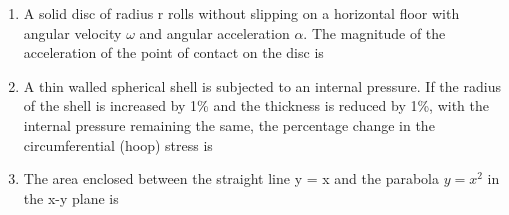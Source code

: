 \documentclass[journal,11pt,onecolumn]{IEEEtran}
\begin{document}
\begin{enumerate}
    \item A solid disc of radius r rolls without slipping on a horizontal floor with angular velocity \(\omega\) and angular acceleration \(\alpha\). The magnitude of the acceleration of the point of contact on the disc is

          \begin{enumerate}
          \end{enumerate}

    \item A thin walled spherical shell is subjected to an internal pressure. If the radius of the shell is increased by 1\% and the thickness is reduced by 1\%, with the internal pressure remaining the same, the percentage change in the circumferential (hoop) stress is

          \begin{enumerate}
          \end{enumerate}

    \item The area enclosed between the straight line y = x and the parabola \(y = x^2\) in the x-y plane is

          \begin{enumerate}
          \end{enumerate}


\end{enumerate}
\end{document}
